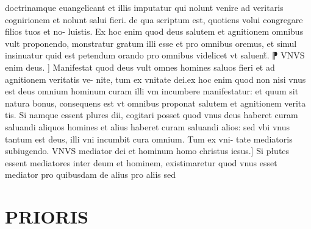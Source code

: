 \documentclass{article}
\begin{document}
\begin{pages}
doctrinamque  euangelicant et illis imputatur qui nolunt venire ad veritaris cognirionem et nolunt salui fieri. de qua scriptum est, quotiens volui congregare filios tuos et no- luistis. Ex hoc enim quod deus salutem et agnitionem omnibus vult proponendo, monstratur gratum illi esse et pro omnibus oremus, et simul insinuatur quid est petendum orando pro omnibus  videlicet vt saluent̃. ⁋ VNVS enim deus. ] Manifestat quod deus vult omnes homines saluos fieri et ad agnitionem veritatis ve- nite, tum ex vnitate dei.ex hoc enim quod non nisi vnus est deus  omnium hominum curam illi vm incumbere manifestatur: et quum sit natura bonus, consequens est vt omnibus proponat salutem et agnitionem verita tis. Si namque  essent plures dii, cogitari posset quod vnus deus haberet curam saluandi aliquos homines  et alius haberet curam saluandi alios: sed vbi vnus tantum est deus, illi vni incumbit cura omnium. Tum ex vni- tate mediatoris  subiugendo. VNVS mediator dei et hominum homo christus iesus.] Si płutes essent mediatores inter deum et hominem, existimaretur quod vnus esset mediator pro quibusdam de alius pro aliis sed  \pend
\section*{PRIORIS }

\end{pages}
\end{document}
